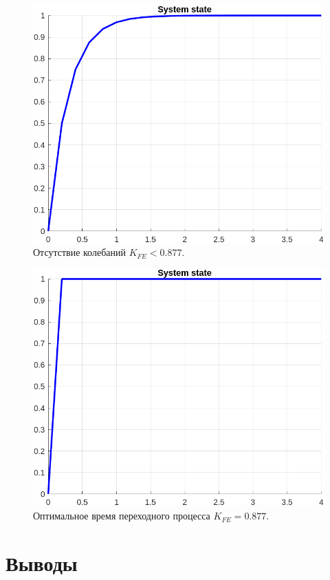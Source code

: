 \documentclass[a4paper, 14pt]{extarticle}
\theoremstyle{definition}
\theoremstyle{plain}
\theoremstyle{remark}
\begin{document}
\begin{figure}
    [H]
    \centering
    \includegraphics[width=350pt]{images/task1_d__no_state.png}
    \caption{Отсутствие колебаний $K_{FE}<0.877$.}
\end{figure}
\begin{figure}
    [H]
    \centering
    \includegraphics[width=350pt]{images/task1_e__optim_state.png}
    \caption{Оптимальное время переходного процесса $K_{FE}=0.877$.}
\end{figure}
\section{Выводы}
\end{document}
